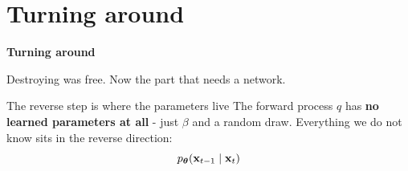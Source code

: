 \documentclass[aspectratio=169]{beamer}
\begin{document}
\section{Turning around}

\begin{frame}[plain]
  \vfill
  \begin{center}
    {\Large\color{popblue}\textbf{Turning around}}\\[0.9em]
    \begin{minipage}{0.82\textwidth}\centering\small
      Destroying was free. Now the part that needs a network.
    \end{minipage}
  \end{center}
  \vfill
\end{frame}

\begin{frame}{The reverse step is where the parameters live}
  \small
  The forward process $q$ has \textbf{no learned parameters at all} - just $\beta$ and
  a random draw. Everything we do not know sits in the reverse direction:
  \[
    p_{\bm{\theta}}(\mathbf{x}_{t-1} \mid \mathbf{x}_t)
  \]
  \begin{columns}[T]
  \end{columns}
\end{frame}
\end{document}
